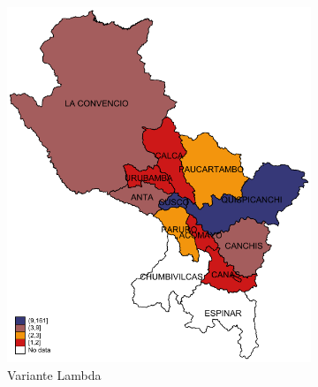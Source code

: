 \documentclass[12pt,a4paper,openany]{book}
\begin{document}
	\begin{figure}[h]
		\caption{Distribución provincial de las variantes de SARS-CoV-2 aisladas en la Región Cusco hasta la SE 25-2022.}
		\label{fig:mapa_variantes}
		\centering
		\begin{subfigure}[b]{0.40\textwidth}
			\centering
			\includegraphics[width=\textwidth]{../figuras/variantes_provincial_lambda.pdf}
			\caption{Variante Lambda}
		\end{subfigure}
		\hfill
		\begin{subfigure}[b]{0.40\textwidth}
			\centering

\end{subfigure}
\end{figure}
\end{document}
